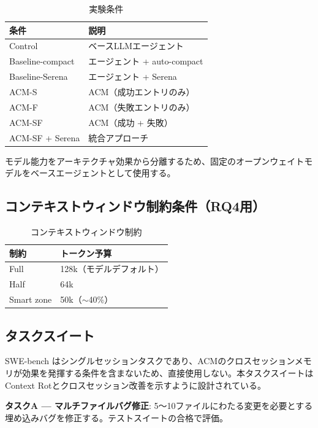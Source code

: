 \documentclass[conference]{IEEEtran}
\begin{document}
\begin{table}[h]
\centering
\caption{実験条件}
\label{tab:conditions}
\small
\begin{tabular}{ll}
\toprule
\textbf{条件} & \textbf{説明} \\
\midrule
Control & ベースLLMエージェント \\
Baseline-compact & エージェント + auto-compact \\
Baseline-Serena & エージェント + Serena \\
ACM-S & ACM（成功エントリのみ） \\
ACM-F & ACM（失敗エントリのみ） \\
ACM-SF & ACM（成功 + 失敗） \\
ACM-SF + Serena & 統合アプローチ \\
\bottomrule
\end{tabular}
\end{table}

モデル能力をアーキテクチャ効果から分離するため、固定のオープンウェイトモデルをベースエージェントとして使用する。

\subsection{コンテキストウィンドウ制約条件（RQ4用）}

\begin{table}[h]
\centering
\caption{コンテキストウィンドウ制約}
\label{tab:constraints}
\small
\begin{tabular}{ll}
\toprule
\textbf{制約} & \textbf{トークン予算} \\
\midrule
Full & 128k（モデルデフォルト） \\
Half & 64k \\
Smart zone & 50k（$\sim$40\%） \\
\bottomrule
\end{tabular}
\end{table}

\subsection{タスクスイート}

SWE-bench \cite{Jimenez2024SWEbench}はシングルセッションタスクであり、ACMのクロスセッションメモリが効果を発揮する条件を含まないため、直接使用しない。本タスクスイートはContext Rotとクロスセッション改善を示すように設計されている。

\textbf{タスクA --- マルチファイルバグ修正}: 5〜10ファイルにわたる変更を必要とする埋め込みバグを修正する。テストスイートの合格で評価。
\end{document}
